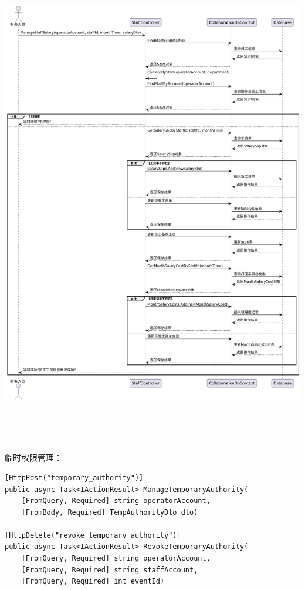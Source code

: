 \documentclass[]{article}
\let\oldincludegraphics\includegraphics
\renewcommand{\includegraphics}[2][]{%
  \begin{center}\oldincludegraphics[#1]{#2}\end{center}%
}
\begin{document}
\includegraphics[width=6.32153in,height=8.45556in]{media/media/image18.png}

临时权限管理：
\begin{verbatim}
[HttpPost("temporary_authority")]
public async Task<IActionResult> ManageTemporaryAuthority(
    [FromQuery, Required] string operatorAccount,
    [FromBody, Required] TempAuthorityDto dto)

[HttpDelete("revoke_temporary_authority")]
public async Task<IActionResult> RevokeTemporaryAuthority(
    [FromQuery, Required] string operatorAccount,
    [FromQuery, Required] string staffAccount,
    [FromQuery, Required] int eventId)
\end{verbatim}
\end{document}
